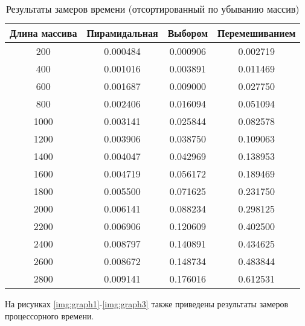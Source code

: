 \begin{table}[h]
    \begin{center}
        \begin{threeparttable}
        \captionsetup{justification=raggedright,singlelinecheck=off}
        \caption{\label{tbl:time_res_3}Результаты замеров времени (отсортированный по убыванию массив)}
        \begin{tabular}{|c|c|c|c|}
            \hline
            Длина массива & Пирамидальная & Выбором & Перемешиванием \\
            \hline
            200 & 0.000484 & 0.000906 & 0.002719 \\ 
            \hline
            400 & 0.001016 & 0.003891 & 0.011469 \\ 
            \hline
            600 & 0.001687 & 0.009000 & 0.027750 \\ 
            \hline
            800 & 0.002406 & 0.016094 & 0.051094 \\ 
            \hline
            1000 & 0.003141 & 0.025844 & 0.082578 \\ 
            \hline
            1200 & 0.003906 & 0.038750 & 0.109063 \\ 
            \hline
            1400 & 0.004047 & 0.042969 & 0.138953 \\ 
            \hline
            1600 & 0.004719 & 0.056172 & 0.189469 \\ 
            \hline
            1800 & 0.005500 & 0.071625 & 0.231750 \\ 
            \hline
            2000 & 0.006141 & 0.088234 & 0.298125 \\ 
            \hline
            2200 & 0.006906 & 0.120609 & 0.402500 \\ 
            \hline
            2400 & 0.008797 & 0.140891 & 0.434625 \\ 
            \hline
            2600 & 0.008672 & 0.148734 & 0.483844 \\ 
            \hline
            2800 & 0.009141 & 0.176016 & 0.612531 \\ 
            \hline
		\end{tabular}
    \end{threeparttable}
\end{center}
\end{table}

\clearpage



На рисунках \ref{img:graph1}-\ref{img:graph3} также приведены результаты замеров процессорного времени.

